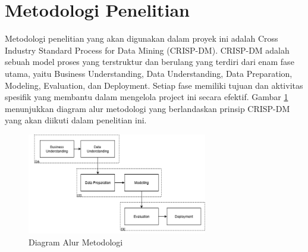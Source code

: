 \newpage

\section{Metodologi Penelitian}


Metodologi penelitian yang akan digunakan dalam proyek ini adalah Cross Industry Standard Process for Data Mining (CRISP-DM). CRISP-DM adalah sebuah model proses yang terstruktur dan berulang yang terdiri dari enam fase utama, yaitu Business Understanding, Data Understanding, Data Preparation, Modeling, Evaluation, dan Deployment. Setiap fase memiliki tujuan dan aktivitas spesifik yang membantu dalam mengelola project ini secara efektif. Gambar \ref{fig:crisp-dm} menunjukkan diagram alur metodologi yang berlandaskan prinsip CRISP-DM yang akan diikuti dalam penelitian ini.

\begin{figure}[H]
    \centering
    \includegraphics[width=0.7\textwidth]{gambar/diagram.png}
    \caption{Diagram Alur Metodologi}
    \label{fig:crisp-dm}
\end{figure}






